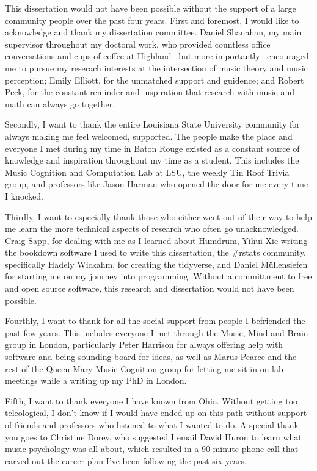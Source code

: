 \documentclass[12pt,]{book}
\begin{document}
This dissertation would not have been possible without the support of a large community people over the past four years.
First and foremost, I would like to acknowledge and thank my dissertation committee.
Daniel Shanahan, my main supervisor throughout my doctoral work, who provided countless office conversations and cups of coffee at Highland-- but more importantly-- encouraged me to pursue my reserach interests at the intersection of music theory and music perception; Emily Elliott, for the unmatched support and guidence; and Robert Peck, for the constant reminder and inspiration that research with music and math can always go together.

Secondly, I want to thank the entire Louisiana State University community for always making me feel welcomed, supported.
The people make the place and everyone I met during my time in Baton Rouge existed as a constant source of knowledge and inspiration throughout my time as a student.
This includes the Music Cognition and Computation Lab at LSU, the weekly Tin Roof Trivia group, and professors like Jason Harman who opened the door for me every time I knocked.

Thirdly, I want to especially thank those who either went out of their way to help me learn the more technical aspects of research who often go unacknowledged.
Craig Sapp, for dealing with me as I learned about Humdrum, Yihui Xie writing the bookdown software I used to write this dissertation, the \#rstats community, specifically Hadely Wickahm, for creating the tidyverse, and Daniel Müllensiefen for starting me on my journey into programming.
Without a committment to free and open source software, this research and dissertation would not have been possible.

Fourthly, I want to thank for all the social support from people I befriended the past few years.
This includes everyone I met through the Music, Mind and Brain group in London, particularly Peter Harrison for always offering help with software and being sounding board for ideas, as well as Marus Pearce and the rest of the Queen Mary Music Cognition group for letting me sit in on lab meetings while a writing up my PhD in London.

Fifth, I want to thank everyone I have known from Ohio.
Without getting too teleological, I don't know if I would have ended up on this path without support of friends and professors who listened to what I wanted to do.
A special thank you goes to Christine Dorey, who suggested I email David Huron to learn what music psychology was all about, which resulted in a 90 minute phone call that carved out the career plan I've been following the past six years.
\end{document}
